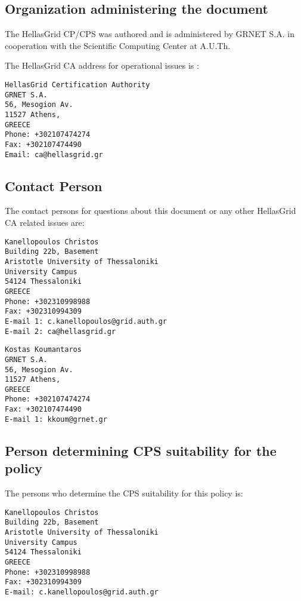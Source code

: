 \subsection{Organization administering the document}
\label{sub:OrganizationAdministeringTheDocument}

The HellasGrid CP/CPS was authored and is administered by GRNET S.A. in cooperation with the Scientific Computing Center at A.U.Th.

The HellasGrid CA address for operational issues is :

\begin{verbatim}
HellasGrid Certification Authority
GRNET S.A.
56, Mesogion Av.
11527 Athens,
GREECE
Phone: +302107474274
Fax: +302107474490
Email: ca@hellasgrid.gr
\end{verbatim}

\subsection{Contact Person}
\label{sub:ContactPerson}

The contact persons for questions about this document or any other HellasGrid CA related issues are:

\begin{verbatim}
Kanellopoulos Christos
Building 22b, Basement
Aristotle University of Thessaloniki
University Campus
54124 Thessaloniki
GREECE
Phone: +302310998988
Fax: +302310994309
E-mail 1: c.kanellopoulos@grid.auth.gr
E-mail 2: ca@hellasgrid.gr
\end{verbatim}

\begin{verbatim}
Kostas Koumantaros
GRNET S.A.
56, Mesogion Av.
11527 Athens,
GREECE
Phone: +302107474274
Fax: +302107474490
E-mail 1: kkoum@grnet.gr
\end{verbatim}

\subsection{Person determining CPS suitability for the policy}

The persons who determine the CPS suitability for this policy is:

\begin{verbatim}
Kanellopoulos Christos
Building 22b, Basement
Aristotle University of Thessaloniki
University Campus
54124 Thessaloniki
GREECE
Phone: +302310998988
Fax: +302310994309
E-mail: c.kanellopoulos@grid.auth.gr
\end{verbatim}

